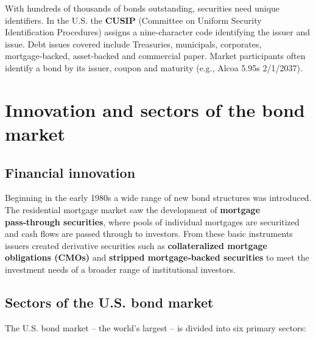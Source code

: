\documentclass[
  letterpaper,
  DIV=11,
  numbers=noendperiod]{scrartcl}
\begin{document}
With hundreds of thousands of bonds outstanding, securities need unique
identifiers. In the U.S. the \textbf{CUSIP} (Committee on Uniform
Security Identification Procedures) assigns a nine‑character code
identifying the issuer and issue. Debt issues covered include
Treasuries, municipals, corporates, mortgage‑backed, asset‑backed and
commercial paper. Market participants often identify a bond by its
issuer, coupon and maturity (e.g., Alcoa 5.95s 2/1/2037).

\section{Innovation and sectors of the bond
market}\label{innovation-and-sectors-of-the-bond-market}

\subsection{Financial innovation}\label{financial-innovation}

Beginning in the early 1980s a wide range of new bond structures was
introduced. The residential mortgage market saw the development of
\textbf{mortgage pass‑through securities}, where pools of individual
mortgages are securitized and cash flows are passed through to
investors. From these basic instruments issuers created derivative
securities such as \textbf{collateralized mortgage obligations (CMOs)}
and \textbf{stripped mortgage‑backed securities} to meet the investment
needs of a broader range of institutional investors.

\subsection{Sectors of the U.S. bond
market}\label{sectors-of-the-u.s.-bond-market}

The U.S. bond market -- the world's largest -- is divided into six
primary sectors:
\end{document}
